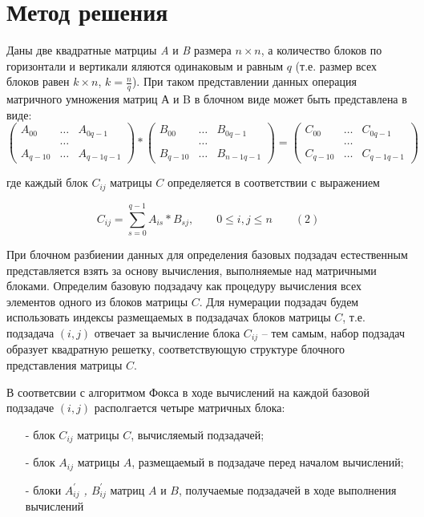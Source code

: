 \documentclass{report}
\begin{document}
\section*{Метод решения}
Даны две квадратные матрциы {\itshape A} и {\itshape B} размера {\itshape $n \times n$}, а количество блоков по горизонтали и вертикали яляются одинаковым и равным {\itshape $q$} (т.е. размер всех блоков равен {\itshape $k \times n$}, {\itshape $k = \frac{n}{q} $}). При таком представлении данных операция матричного умножения матриц А и B в блочном виде может быть представлена в виде:
$$
\begin{pmatrix}
A_{00}& \ldots & A_{0q-1}\\
& \ldots\\
A_{q-10}& \ldots & A_{q-1q-1}
\end{pmatrix}
*
\begin{pmatrix}
B_{00}& \ldots & B_{0q-1}\\
& \ldots\\
B_{q-10}& \ldots & B_{n-1q-1}
\end{pmatrix}
=
\begin{pmatrix}
C_{00}& \ldots & C_{0q-1}\\
&\ldots\\
C_{q-10}& \ldots & C_{q-1q-1}
\end{pmatrix}
$$

где каждый блок $C_{ij}$ матрицы {\itshape $C$} определяется в соответствии с выражением
\par$$
    C_{ij} = \sum_{s=0}^{q-1} A_{is} * B_{sj},\qquad 0 \le i,j \le n \qquad (2)
    $$
\par При блочном разбиении данных для определения базовых подзадач естественным представляется взять за основу вычисления, выполняемые над матричными блоками. Определим базовую подзадачу как процедуру вычисления всех элементов одного из блоков матрицы {\itshape $C$}. Для нумерации подзадач будем использовать индексы размещаемых в подзадачах блоков матрицы {\itshape $C$}, т.е. подзадача {\itshape $(i,j)$} отвечает за вычисление блока {\itshape $C_{ij}$} – тем самым, набор подзадач образует квадратную решетку, соответствующую структуре блочного представления матрицы {\itshape $C$}.
\par В соответсвии с алгоритмом Фокса в ходе вычислений на каждой базовой подзадаче {\itshape $(i,j)$} располгается четыре матричных блока:
\begin{itemize}
    \item[-] блок {\itshape $C_{ij}$} матрицы {\itshape $C$}, вычисляемый подзадачей;
    \item[-] блок {\itshape $A_{ij}$} матрицы {\itshape $A$}, размещаемый в подзадаче перед началом вычислений;
    \item[-] блоки {\itshape $A_{ij}^{'}$ , $B_{ij}^{'}$} матриц {\itshape $A$} и {\itshape $B$}, получаемые подзадачей в ходе выполнения вычислений
\end{itemize}
\newpage
\end{document}
